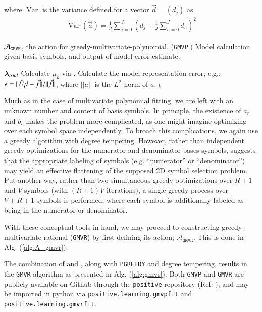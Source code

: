 \documentclass[twocolumn,aps,prd,floatfix,preprintnumbers,a4paper,nofootinbib,
superscriptaddress,10pt]{revtex4-1}
\def\gmvp#1{greedy-multivariate-polynomial#1
  (\texttt{GMVP}#1)\gdef\gmvp{\texttt{GMVP}}}
\def\gmvr#1{greedy-multivariate-rational#1
  (\texttt{GMVR}#1)\gdef\gmvr{\texttt{GMVR}}}
\def\pgreedy{\texttt{PGREEDY}}
\begin{document}
%
where $\operatorname{Var}$ is the variance defined for a vector $\vec{d} = (d_j)$ as
%
\begin{align}
  \label{eq:ratvar}
  \operatorname{Var}\left(\vec{a}\right)  = \frac{1}{J}\sum_{j=0}^{J}\left(d_j - \frac{1}{J}\sum_{u=0}^{J}d_u\right)^2
\end{align}
%
{\scriptsize
\begin{algorithm}[H]
  \caption{$\mathcal{A}_{\gmvp}$, the action for \gmvp. Model calculation given basis symbols, and output of model error estimate.}
  \label{alg:A_gmvp}
  \begin{algorithmic}[1]
     ${\bm{\lambda}}_{trial}$
    \vskip 10pt
    \State Calculate $\mu_k$ via .
    \State Calculate the model representation error, e.g.: $\epsilon = ||\hat{U} \vec{\mu} - \vec{f}||/||\vec{f}||$, where $||a||$ is the $L^2$ norm of $a$.
    \vskip 10pt
     $\epsilon$
  \end{algorithmic}
\end{algorithm}
}
%
\par Much as in the case of multivariate polynomial fitting, we are left with an unknown number and content of basis symbols.
%
In principle, the existence of $a_r$ and $b_v$ makes the problem more complicated, as one might imagine optimizing over each symbol space independently.
%
To broach this complications, we again use a greedy algorithm with degree tempering.
%
However, rather than independent greedy optimizations for the numerator and denominator bases symbols,  suggests that the appropriate labeling of symbols (e.g. ``numerator'' or ``denominator'') may yield an effective flattening of the supposed 2D symbol selection problem.
%
Put another way, rather than two simultaneous greedy optimizations over $R+1$ and $V$ symbols (with $(R+1)V$ iterations), a single greedy process over $V+R+1$ symbols is performed, where each symbol is additionally labeled as being in the numerator or denominator.
%
\par With these conceptual tools in hand, we may proceed to constructing \gmvr{} by first defining its action, $\mathcal{A}_{\gmvr}$.
%
This is done in Alg. (\ref{alg:A_gmvr}).
%
\par The combination of  and , along with \pgreedy{} and degree tempering, results in the \gmvr{} algorithm as presented in Alg. (\ref{alg:gmvr}).
%
%
Both \gmvp{} and \gmvr{} are publicly available on Github through the \texttt{positive} repository (Ref. \cite{lionel_london_2018_1402516}), and may be imported in python via {\small{\texttt{positive.learning.gmvpfit}}} and {\small{\texttt{positive.learning.gmvrfit}}}.
%
%
\end{document}
